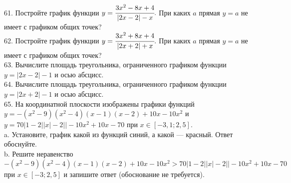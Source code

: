 \\
61. Постройте график функции $y=\cfrac{3x^2-8x+4}{|2x-2|-x}.$ При каких $a$ прямая $y=a$ не имеет с графиком общих точек?\\
62. Постройте график функции $y=\cfrac{3x^2+8x+4}{|2x+2|+x}.$ При каких $a$ прямая $y=a$ не имеет с графиком общих точек?\\
63. Вычислите площадь треугольника, ограниченного графиком функции $y=|2x-2|-1$ и осью абсцисс.\\
64. Вычислите площадь треугольника, ограниченного графиком функции $y=|2x+2|-1$ и осью абсцисс.\\
65. На координатной плоскости изображены графики функций $y=-(x^2-9)(x^2-4)(x-1)(x-2)+10x-10x^2$ и $y=70|1-2||x|-2||-10x^2+10x-70$ при
$x\in[-3,1;2,5].$\\
a. Установите, график какой из функций синий, а какой --- красный. Ответ обоснуйте.\\
b. Решите неравенство  $-(x^2-9)(x^2-4)(x-1)(x-2)+10x-10x^2 >70|1-2||x|-2||-10x^2+10x-70$ при
$x\in[-3;2,5]$ и запишите ответ (обоснование не требуется).
\begin{center}\end{center}
